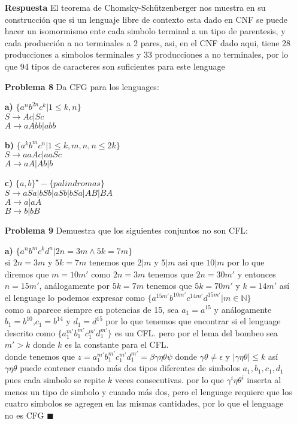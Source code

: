 \documentclass{article}
\begin{document}
\begin{enumerate}
\item[\bf{Respuesta}]
El teorema de Chomsky-Schützenberger nos muestra en su construcción que si un lenguaje libre de contexto esta dado en CNF se puede hacer un isomormismo ente cada simbolo terminal a un tipo de parentesis, y cada producción a no terminales a 2 pares, asi, en el CNF dado aqui, tiene 28 producciones a simbolos terminales y 33 producciones a no terminales, por lo que 94 tipos de caracteres son suficientes para este lenguage

\item[\bf{Problema 8}]  Da CFG para los lenguages:

\item[\bf{a)}]  $ \{a^{n}b^{2n}c^{k}| 1 \le k,n \}$\\
$S \rightarrow Ac|Sc $\\
$A \rightarrow aAbb|abb $

\item[\bf{b)}]  $ \{a^{k}b^{m}c^{n}| 1 \le k,m,n, n\le 2k\}$\\

$S \rightarrow aaAc|aaSc $\\
$A \rightarrow aA|Ab|b $\\

\item[\bf{c)}]  $ \{a,b\}^{\star} - \{palindromas\}$\\

$S \rightarrow aSa| bSb | aSb | bSa | AB | BA $\\
$A \rightarrow a| aA $\\
$B \rightarrow b|bB $\\


\item[\bf{Problema 9}] Demuestra que los siguientes conjuntos no son CFL:
\item[\bf{a)}]  $\{a^{n}b^{m}c^{k}d^{n}| 2n=3m \wedge 5k=7m  \}$\\
si $2n=3m$ y $5k=7m$ tenemos que $2|m$ y $5|m$ asi que $10|m$ por lo que diremos que $m=10m'$
como $2n=3m$ tenemos que $2n=30m'$ y entonces $n=15m'$, análogamente por $5k=7m$ tenemos que $5k=70m'$ y $k=14m'$
así el lenguage lo podemos expresar como $\{a^{15m'}b^{10m'}c^{14m'}d^{15m'}| m \in \mathbb{N}  \}$\\
como a aparece siempre en potencias de 15, sea $a_1=a^{15}$ y análogamente $b_1=b^{10}$,$c_1=b^{14}$ y $d_1=d^{15}$
por lo que tenemos que encontrar si el lenguage descrito como $\{a_1^{m'}b_1^{m'}c_1^{m'}d_1^{m'}\}$ es un CFL.
pero por el lema del bombeo sea $m'>k$ donde $k$ es la constante para el CFL.\\
donde tenemos que $z= a_1^{m'}b_1^{m'}c_1^{m'}d_1^{m'} = \beta \gamma \eta \theta \psi $ donde $ \gamma \theta \ne \epsilon$ y $|\gamma \eta \theta | \le k$
así $\gamma \eta \theta$ puede contener cuando más dos tipos diferentes de simbolos $a_1,b_1,c_1,d_1$ pues cada simbolo se repite $k$ veces consecutivas.
por lo que $\gamma^i \eta \theta^i$ inserta al menos un tipo de simbolo y cuando más dos, pero el lenguage requiere que los cuatro simbolos se agregen en las mismas
cantidades, por lo que el lenguage no es CFG $\blacksquare$


\end{enumerate}
\end{document}
